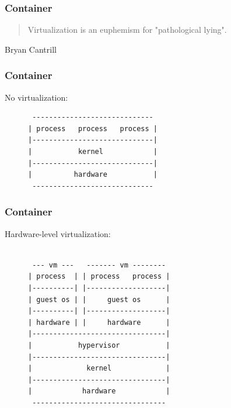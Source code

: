 \documentclass{beamer}
\begin{document}
\begin{frame}
    \frametitle{Container}
    \begin{quote}
        Virtualization is an euphemism for "pathological lying".
    \end{quote}
    Bryan Cantrill
\end{frame}

\begin{frame}[fragile]
    \frametitle{Container}
    No virtualization:
    \begin{figure}
        \centering
        \begin{varwidth}{\linewidth}
            \begin{verbatim}
 -----------------------------
| process   process   process |
|-----------------------------|
|           kernel            |
|-----------------------------|
|          hardware           |
 -----------------------------
            \end{verbatim}
        \end{varwidth}
    \end{figure}
\end{frame}

\begin{frame}[fragile]
    \frametitle{Container}
    Hardware-level virtualization:
    \begin{figure}
        \centering
        \begin{varwidth}{\linewidth}
            \begin{verbatim}

 --- vm ---   ------- vm --------
| process  | | process   process |
|----------| |-------------------|
| guest os | |     guest os      |
|----------| |-------------------|
| hardware | |     hardware      |
|--------------------------------|
|           hypervisor           |
|--------------------------------|
|             kernel             |
|--------------------------------|
|            hardware            |
 --------------------------------
            \end{verbatim}
        \end{varwidth}
    \end{figure}
\end{frame}
\end{document}
